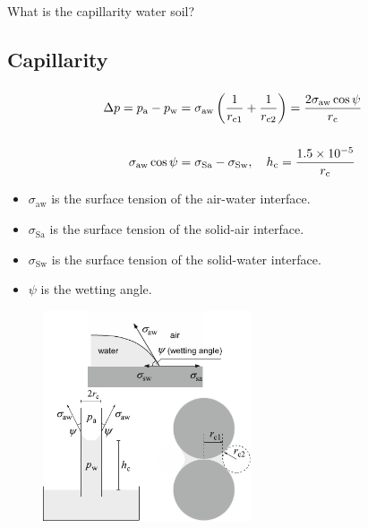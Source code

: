 \begin{frame}
	\begin{center}\Huge %
		What is the capillarity water soil?
	\end{center}
\end{frame}

\subsection{Capillarity}

\begin{frame}
	\frametitle{\subsecname}
	\begin{minipage}{0.5\textwidth}
		\begin{align*}
			\Delta p=p_{\mathrm{a}}-p_{\mathrm{w}} & =
			\sigma_{\mathrm{aw}}\left(\frac{1}{r_{\mathrm{c} 1}}+\frac{1}{r_{\mathrm{c} 2}}\right)
			=\frac{2 \sigma_{\mathrm{aw}} \cos \psi}{r_{\mathrm{c}}}                                  \\[\baselineskip]
			\sigma_{\mathrm{aw}}\cos\psi           & =\sigma_{\mathrm{Sa}}-\sigma_{\mathrm{Sw}},\quad
			h_{\mathrm{c}} =\frac{1.5 \times 10^{-5}}{r_{\mathrm{c}}}
		\end{align*}
		\begin{itemize}
			\item $\sigma_{\mathrm{aw}}$ is the surface tension of the air-water interface.
			\item $\sigma_{\mathrm{Sa}}$ is the surface tension of the solid-air interface.
			\item $\sigma_{\mathrm{Sw}}$ is the surface tension of the solid-water interface.
			\item $\psi$ is the wetting angle.
		\end{itemize}
	\end{minipage}
	\begin{minipage}{0.47\textwidth}
		\begin{figure}[ht!]
			\centering
			\includegraphics[height=6.2cm]{capillar_preassure}
		\end{figure}
	\end{minipage}
\end{frame}


